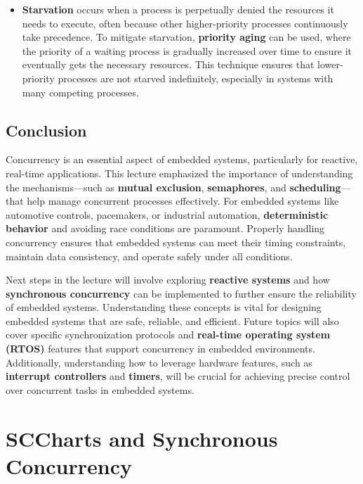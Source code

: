 \documentclass[
  14pt,
  a4paper,
  numbers=noendperiod,
  headinclude=true,
  footinclude=true,
  DIV=calc]{scrreprt}
\providecommand{\tightlist}{%
  \setlength{\itemsep}{0pt}\setlength{\parskip}{0pt}}\usepackage{longtable,booktabs,array}
\begin{document}
\begin{itemize}
\tightlist
\item
  \textbf{Starvation} occurs when a process is perpetually denied the
  resources it needs to execute, often because other higher-priority
  processes continuously take precedence. To mitigate starvation,
  \textbf{priority aging} can be used, where the priority of a waiting
  process is gradually increased over time to ensure it eventually gets
  the necessary resources. This technique ensures that lower-priority
  processes are not starved indefinitely, especially in systems with
  many competing processes.
\end{itemize}

\section{Conclusion}\label{conclusion}

Concurrency is an essential aspect of embedded systems, particularly for
reactive, real-time applications. This lecture emphasized the importance
of understanding the mechanisms---such as \textbf{mutual exclusion},
\textbf{semaphores}, and \textbf{scheduling}---that help manage
concurrent processes effectively. For embedded systems like automotive
controls, pacemakers, or industrial automation, \textbf{deterministic
behavior} and avoiding race conditions are paramount. Properly handling
concurrency ensures that embedded systems can meet their timing
constraints, maintain data consistency, and operate safely under all
conditions.

Next steps in the lecture will involve exploring \textbf{reactive
systems} and how \textbf{synchronous concurrency} can be implemented to
further ensure the reliability of embedded systems. Understanding these
concepts is vital for designing embedded systems that are safe,
reliable, and efficient. Future topics will also cover specific
synchronization protocols and \textbf{real-time operating system (RTOS)}
features that support concurrency in embedded environments.
Additionally, understanding how to leverage hardware features, such as
\textbf{interrupt controllers} and \textbf{timers}, will be crucial for
achieving precise control over concurrent tasks in embedded systems.

\chapter{SCCharts and Synchronous
Concurrency}\label{sccharts-and-synchronous-concurrency}
\end{document}
